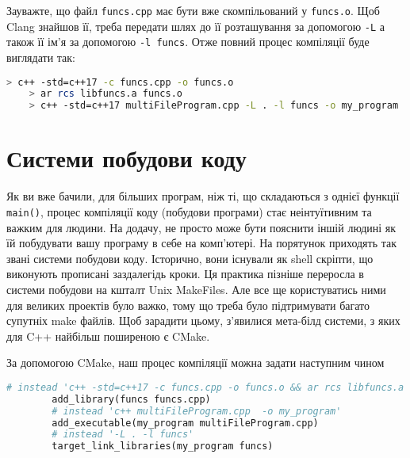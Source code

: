 \documentclass[12pt]{article}
\begin{document}
	Зауважте, що файл \texttt{funcs.cpp} має бути вже скомпільований у \texttt{funcs.o}. Щоб Clang знайшов її, треба передати шлях до її розташування за допомогою \texttt{-L} а також її ім'я за допомогою \texttt{-l funcs}. Отже повний процес компіляції буде виглядати так:
	\begin{lstlisting}[language=bash]
	> c++ -std=c++17 -c funcs.cpp -o funcs.o
	> ar rcs libfuncs.a funcs.o
	> c++ -std=c++17 multiFileProgram.cpp -L . -l funcs -o my_program
	\end{lstlisting}

	\section{Системи побудови коду}
	Як ви вже бачили, для більших програм, ніж ті, що складаються з однієї функції \texttt{main()}, процес компіляції коду (побудови програми) стає неінтуїтивним та важким для людини. На додачу, не просто може бути пояснити іншій людині як їй побудувати вашу програму в себе на комп'ютері. На порятунок приходять так звані системи побудови коду. Історично, вони існували як shell скріпти, що виконують прописані заздалегідь кроки. Ця практика пізніше переросла в системи побудови на кшталт Unix MakeFiles. Але все ще користуватись ними для великих проектів було важко, тому що треба було підтримувати багато супутніх make файлів. Щоб зарадити цьому, з'явилися мета-білд системи, з яких для C++ найбільш поширеною є CMake. 
	
	За допомогою CMake, наш процес компіляції можна задати наступним чином
	\begin{lstlisting}[language=make]
		# instead 'c++ -std=c++17 -c funcs.cpp -o funcs.o && ar rcs libfuncs.a funcs.o'
		add_library(funcs funcs.cpp) 
		# instead 'c++ multiFileProgram.cpp  -o my_program'
		add_executable(my_program multiFileProgram.cpp) 
		# instead '-L . -l funcs'
		target_link_libraries(my_program funcs) 
	\end{lstlisting}
\end{document}
